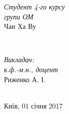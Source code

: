 \begin{titlepage}
\begin{minipage}{0.4\textwidth}
\begin{flushleft} \large
\emph{Студент 4-го курсу}\\
\emph{групи ОМ}\\
Чан Ха Ву %
\end{flushleft}
\end{minipage}
~
\begin{minipage}{0.4\textwidth}
\begin{flushright} \large
\emph{Викладач:} \\
\emph{к.ф.-м.н., доцент} \\
Риженко \textsc{А. І.} %
\end{flushright}
\end{minipage}\\[4cm]



{\large Київ, 01 січня 2017}\\[3cm] %


 

\vfill %
\end{titlepage}

\renewcommand{\refname}{Літератури та посилання}
\renewcommand{\figurename}{Мал.}

